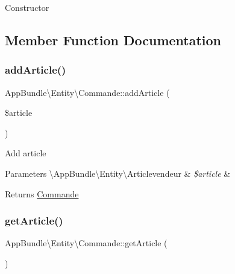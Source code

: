 Constructor 

\subsection{Member Function Documentation}
\mbox{\label{class_app_bundle_1_1_entity_1_1_commande_a9eeb7ff3fd0e9f000dd017e419c9a07b}} 
\subsubsection{\texorpdfstring{add\+Article()}{addArticle()}}
{\footnotesize\ttfamily App\+Bundle\textbackslash{}\+Entity\textbackslash{}\+Commande\+::add\+Article (\begin{DoxyParamCaption}\item[{\textbackslash{}\hyperlink{class_app_bundle_1_1_entity_1_1_articlevendeur}{App\+Bundle\textbackslash{}\+Entity\textbackslash{}\+Articlevendeur}}]{\$article }\end{DoxyParamCaption})}

Add article


\begin{DoxyParams}[1]{Parameters}
\textbackslash{}\+App\+Bundle\textbackslash{}\+Entity\textbackslash{}\+Articlevendeur & {\em \$article} & \\
\hline
\end{DoxyParams}
\begin{DoxyReturn}{Returns}
\hyperlink{class_app_bundle_1_1_entity_1_1_commande}{Commande} 
\end{DoxyReturn}
\mbox{\label{class_app_bundle_1_1_entity_1_1_commande_afbcfc733ac7f6689496547c475381df4}} 
\subsubsection{\texorpdfstring{get\+Article()}{getArticle()}}
{\footnotesize\ttfamily App\+Bundle\textbackslash{}\+Entity\textbackslash{}\+Commande\+::get\+Article (\begin{DoxyParamCaption}{ }\end{DoxyParamCaption})}


